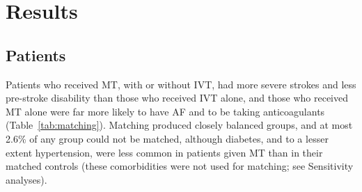 \section{Results}

\subsection{Patients}

Patients who received MT, with or without IVT, had more severe strokes and less pre-stroke disability than those who received IVT alone, and those who received MT alone were far more likely to have AF and to be taking anticoagulants (Table~\ref{tab:matching}). Matching produced closely balanced groups, and at most 2.6\% of any group could not be matched, although diabetes, and to a lesser extent hypertension, were less common in patients given MT than in their matched controls (these comorbidities were not used for matching; see Sensitivity analyses).

